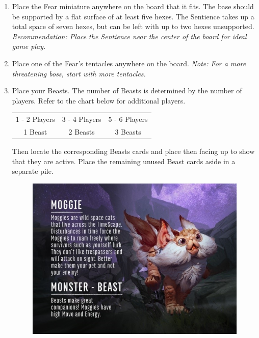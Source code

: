 \documentclass[../main.tex]{subfiles}
\begin{document}
\begin{enumerate}
    \item Place the Fear miniature anywhere on the board that it fits. The base should be supported by a flat surface of at least five hexes. The Sentience takes up a total space of seven hexes, but can be left with up to two hexes unsupported. 
    \textit{Recommendation: Place the Sentience near the center of the board for ideal game play. }
    \item Place one of the Fear's tentacles anywhere on the board. 
    \textit{Note: For a more threatening boss, start with more tentacles. }
    \item Place your Beasts. The number of Beasts is determined by the number of players. Refer to the chart below for additional players. 
    
    \begin{table}[h]
        \centering
        \begin{tabular}{ccc}
             1 - 2 Players  & 3 - 4 Players & 5 - 6 Players\\
             1 Beast & 2 Beasts  & 3 Beasts \\
        \end{tabular}
    \end{table}
    
    Then locate the corresponding Beasts cards and place then facing up to show that they are active. Place the remaining unused Beast cards aside in a separate pile. 
    
    \begin{figure}[h]
        \centering
        \includegraphics[width=1\linewidth]{chapters//boardsetup/TimeStrikeBeastCard.jpg}
    \end{figure}
    
\end{enumerate}
\clearpage
\end{document}
